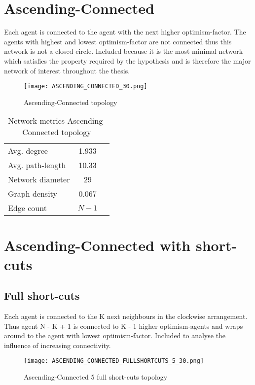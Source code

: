 \documentclass[Bachelorarbeit.tex]{subfiles}
\begin{document}
\pagebreak

\section{Ascending-Connected}
Each agent is connected to the agent with the next higher optimism-factor. The agents with highest and lowest optimism-factor are not connected thus this network is not a closed circle. Included because it is the most minimal network which satisfies the property required by the hypothesis and is therefore the major network of interest throughout the thesis.

\begin{figure}[H]
	\centering
  \texttt{[image: ASCENDING\_CONNECTED\_30.png]}
	\caption{Ascending-Connected topology}
	\label{fig:topology_ASCENDING_CONNECTED_30}
\end{figure}

\begin{table}[H]
	\centering
	\caption{Network metrics Ascending-Connected topology}
	\begin{tabular} { l c r }
		\hline
		Avg. degree & 1.933 \\
		Avg. path-length & 10.33 \\
		Network diameter & 29 \\
		Graph density & 0.067 \\
		Edge count & $N-1$ \\
		\hline
	\end{tabular}
\end{table}

\pagebreak

\section{Ascending-Connected with short-cuts}
\subsection{Full short-cuts}
Each agent is connected to the K next neighbours in the clockwise arrangement. Thus agent N - K + 1 is connected to K - 1 higher optimism-agents and wraps around to the agent with lowest optimism-factor. Included to analyse the influence of increasing connectivity.

\begin{figure}[H]
	\centering
  \texttt{[image: ASCENDING\_CONNECTED\_FULLSHORTCUTS\_5\_30.png]}
	\caption{Ascending-Connected 5 full short-cuts topology}
	\label{fig:topology_ASCENDING_CONNECTED_FULLSHORTCUTS_5_30}
\end{figure}
\end{document}
